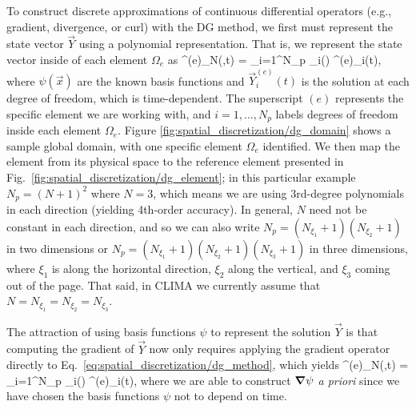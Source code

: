 \documentclass{report}
\begin{document}
{To construct discrete approximations of continuous differential operators (e.g., gradient, divergence, or curl) with the DG method, we first must represent the state vector $\vec{Y}$ using a polynomial representation.  That is, we represent the state vector inside of each element $\Omega_e$ as
\be
{}^{(e)}_N(,t) = \sum_{i=1}^{N_p} \psi_i() ^{(e)}_i(t),
\label{eq:spatial_discretization/dg_method}
\ee
where $\psi(\vec{x})$ are the known basis functions and $\vec{Y}^{(e)}_i(t)$ is
the solution at each degree of freedom, which is time-dependent. The superscript
$(e)$ represents the specific element we are working with, and $i=1,\ldots,N_p$
labels degrees of freedom inside each element $\Omega_e$.  Figure
\ref{fig:spatial_discretization/dg_domain} shows a sample global domain, with
one specific element $\Omega_e$ identified.  We then map the element from its
physical space to the reference element presented in Fig.\
\ref{fig:spatial_discretization/dg_element}; in this particular example
$N_p=(N+1)^2$ where $N=3$, which means we are using 3rd-degree polynomials in
each direction (yielding 4th-order accuracy).  In general, $N$ need not be
constant in each direction, and so we can also write
$N_p=(N_{\xi_{1}}+1)(N_{\xi_{2}}+1)$ in two dimensions or
$N_p=(N_{\xi_{1}}+1)(N_{\xi_{2}}+1)(N_{\xi_{3}}+1)$ in three dimensions, where
$\xi_{1}$ is along the horizontal direction, $\xi_{2}$ along the vertical, and
$\xi_{3}$ coming out of the page. That said, in CLIMA we currently 
assume that $N = N_{\xi_{1}} = N_{\xi_{2}} = N_{\xi_{3}}$.

The attraction of using basis functions $\psi$ to represent the solution $\vec{Y}$ is that computing the gradient of $\vec{Y}$ now only requires applying the gradient operator directly to Eq.~\eqref{eq:spatial_discretization/dg_method}, which yields
\be
\nabla {}^{(e)}_N(,t) = \sum_{i=1}^{N_p} \nabla \psi_i() ^{(e)}_i(t),
\label{eq:spatial_discretization/dg_method/gradient}
\ee
where we are able to construct $\boldsymbol{{\nabla}} \psi$ \emph{a priori} since we have chosen the basis functions $\psi$ not to depend on time.

}
\end{document}
